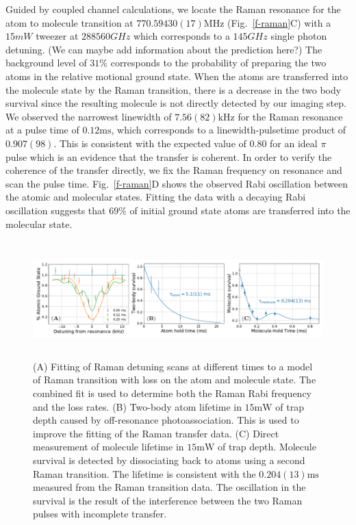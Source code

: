 \documentclass[aps,prl,twocolumn,superscriptaddress]{revtex4-1}
\newcommand{\todo}[1]{}
\begin{document}
Guided by coupled channel calculations, we locate the Raman resonance for the atom to molecule transition at $770.59430(17) \mathrm{MHz}$ (Fig.~\ref{f-raman}C) with a $15 mW$ tweezer at $288560 GHz$ which corresponds to a $145 GHz$ single photon detuning. (We can maybe add information about the prediction here?)
The background level of $31\%$ corresponds to the probability of preparing the two atoms in the relative motional ground state. When the atoms are transferred into the molecule state by the Raman transition, there is a decrease in the two body survival since the resulting molecule is not directly detected by our imaging step.
We observed the narrowest linewidth of $7.56(82) \mathrm{kHz}$ for the Raman resonance at a pulse time of $0.12 \mathrm{ms}$, which corresponds to a linewidth-pulsetime product of $0.907(98)$. This is consistent with the expected value of $0.80$ for an ideal $\pi$ pulse which is an evidence that the transfer is coherent. In order to verify the coherence of the transfer directly, we fix the Raman frequency on resonance and scan the pulse time. Fig.~\ref{f-raman}D shows the observed Rabi oscillation between the atomic and molecular states. Fitting the data with a decaying Rabi oscillation suggests that $69\%$ of initial ground state atoms are transferred into the molecular state.


\begin{figure}
  \includegraphics[height=4.5cm]{fig3.pdf}
  \caption{
    (A) Fitting of Raman detuning scans at different times to a model of Raman transition
    with loss on the atom and molecule state. The combined fit is used to determine
    both the Raman Rabi frequency and the loss rates.
    (B) \todo{inset?} Two-body atom lifetime in $15 \mathrm{mW}$ of trap depth caused by
    off-resonance photoassociation.
    This is used to improve the fitting of the Raman transfer data.
    (C) Direct measurement of molecule lifetime in $15 \mathrm{mW}$ of trap depth.
    Molecule survival is detected by dissociating back to atoms using a second Raman transition.
    The lifetime is consistent with the $0.204(13) \mathrm{ms}$
    measured from the Raman transition data.
    The oscillation in the survival is the result of the interference
    between the two Raman pulses with incomplete transfer.
    \label{f-lifetime}}
\end{figure}
\end{document}
